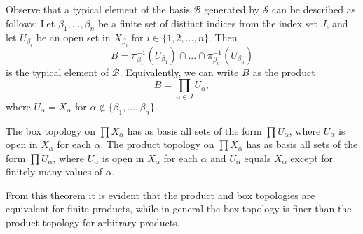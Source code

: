 \documentclass[12pt, a4paper, oneside, openright, titlepage]{book}
\begin{document}
Observe that a typical element of the basis $\mathcal{B}$ generated by $\mathcal{S}$ can be described as follows: Let $\beta_1,...,\beta_n$ be a finite set of distinct indices from the index set $J$, and let $U_{\beta_i}$ be an open set in $X_{\beta_i}$ for $i \in \{1,2,...,n\}$. Then \begin{equation*}
    B = \pi_{\beta_1}^{-1}(U_{\beta_1})\cap...\cap\pi_{\beta_n}^{-1}(U_{\beta_n})
\end{equation*}
is the typical element of $\mathcal{B}$. Equivalently, we can write $B$ as the product \begin{equation*}
    B = \prod\limits_{\alpha \in J}U_{\alpha},
\end{equation*}
where $U_{\alpha} = X_{\alpha}$ for $\alpha \notin \{\beta_1,...,\beta_n\}$.


\begin{thm}
    The box topology on $\prod X_{\alpha}$ has as basis all sets of the form $\prod U_{\alpha}$, where $U_{\alpha}$ is open in $X_{\alpha}$ for each $\alpha$. The product topology on $\prod X_{\alpha}$ has as basis all sets of the form $\prod U_{\alpha}$, where $U_{\alpha}$ is open in $X_{\alpha}$ for each $\alpha$ and $U_{\alpha}$ equals $X_{\alpha}$ except for finitely many values of $\alpha$.
\end{thm}

From this theorem it is evident that the product and box topologies are equivalent for finite products, while in general the box topology is finer than the product topology for arbitrary products.
\end{document}
